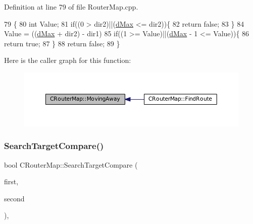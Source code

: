 Definition at line 79 of file Router\+Map.\+cpp.


\begin{DoxyCode}
79                                                            \{
80     \textcolor{keywordtype}{int} Value;
81     \textcolor{keywordflow}{if}((0 > dir2)||(\hyperlink{GameDataTypes_8h_acb2b033915f6659a71a38b5aa6e4eb42af6546049275557ce0ade2ceee042a319}{dMax} <= dir2))\{
82         \textcolor{keywordflow}{return} \textcolor{keyword}{false};    
83     \}
84     Value = ((\hyperlink{GameDataTypes_8h_acb2b033915f6659a71a38b5aa6e4eb42af6546049275557ce0ade2ceee042a319}{dMax} + dir2) - dir1) %
85     \textcolor{keywordflow}{if}((1 >= Value)||(\hyperlink{GameDataTypes_8h_acb2b033915f6659a71a38b5aa6e4eb42af6546049275557ce0ade2ceee042a319}{dMax} - 1 <= Value))\{
86         \textcolor{keywordflow}{return} \textcolor{keyword}{true};   
87     \}
88     \textcolor{keywordflow}{return} \textcolor{keyword}{false};
89 \}
\end{DoxyCode}
Here is the caller graph for this function\+:\nopagebreak
\begin{figure}[H]
\begin{center}
\leavevmode
\includegraphics[width=350pt]{classCRouterMap_adf9041b4e1face1308c556c0ba0de9af_icgraph}
\end{center}
\end{figure}
\hypertarget{classCRouterMap_a1a581c85a34b6d0fcc5ddc3d0ae7fb00}{}\label{classCRouterMap_a1a581c85a34b6d0fcc5ddc3d0ae7fb00} 
\subsubsection{\texorpdfstring{Search\+Target\+Compare()}{SearchTargetCompare()}}
{\footnotesize\ttfamily bool C\+Router\+Map\+::\+Search\+Target\+Compare (\begin{DoxyParamCaption}\item[{const \hyperlink{structCRouterMap_1_1SSearchTarget}{S\+Search\+Target} \&}]{first,  }\item[{const \hyperlink{structCRouterMap_1_1SSearchTarget}{S\+Search\+Target} \&}]{second }\end{DoxyParamCaption})\hspace{0.3cm}{\ttfamily [static]}, {\ttfamily [protected]}}



